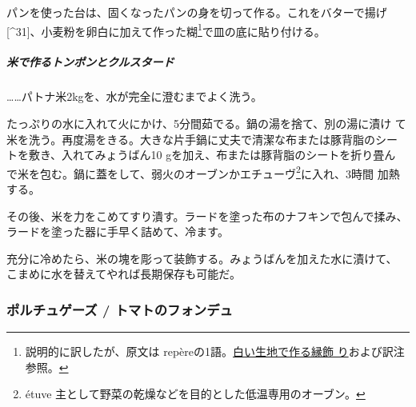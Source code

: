 \begin{recette}
パンを使った台は、固くなったパンの身を切って作る。これをバターで揚げ
{[}\^{}31{]}、小麦粉を卵白に加えて作った糊\footnote{説明的に訳したが、原文は
  repèreの1語。\protect\hyperlink{bordures-en-pate-blanche}{白い生地で作る縁飾
  り}および訳注参照。}で皿の底に貼り付ける。

\hypertarget{ux7c73ux3067ux4f5cux308bux30c8ux30f3ux30ddux30f3ux3068ux30afux30ebux30b9ux30bfux30fcux30c9}{%
\subparagraph{米で作るトンポンとクルスタード}\label{ux7c73ux3067ux4f5cux308bux30c8ux30f3ux30ddux30f3ux3068ux30afux30ebux30b9ux30bfux30fcux30c9}}

\ldots{}\ldots{}パトナ米2kgを、水が完全に澄むまでよく洗う。

たっぷりの水に入れて火にかけ、5分間茹でる。鍋の湯を捨て、別の湯に漬け
て米を洗う。再度湯をきる。大きな片手鍋に丈夫で清潔な布または豚背脂のシー
トを敷き、入れてみょうばん10 gを加え、布または豚背脂のシートを折り畳ん
で米を包む。鍋に蓋をして、弱火のオーブンかエチューヴ\footnote{étuve
  主として野菜の乾燥などを目的とした低温専用のオーブン。}に入れ、3時間
加熱する。

その後、米を力をこめてすり潰す。ラードを塗った布のナフキンで包んで揉み、
ラードを塗った器に手早く詰めて、冷ます。

充分に冷めたら、米の塊を彫って装飾する。みょうばんを加えた水に漬けて、
こまめに水を替えてやれば長期保存も可能だ。

\maeaki

\hypertarget{portugaise}{%
\subsubsection{ポルチュゲーズ / トマトのフォンデュ}\label{portugaise}}


\end{recette}
